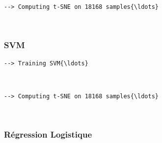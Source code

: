 \documentclass[11pt]{article}
\begin{document}
\begin{center}
\end{center}
{ \hspace*{\fill} \\}

\begin{Verbatim}[commandchars=\\\{\}]
  --> Computing t-SNE on 18168 samples{\ldots}
\end{Verbatim}

\begin{center}
\end{center}
{ \hspace*{\fill} \\}

\subsubsection{SVM}\label{svm}

\begin{Verbatim}[commandchars=\\\{\}]
  --> Training SVM{\ldots}
\end{Verbatim}

\begin{center}
\end{center}
{ \hspace*{\fill} \\}

\begin{Verbatim}[commandchars=\\\{\}]
  --> Computing t-SNE on 18168 samples{\ldots}
\end{Verbatim}

\begin{center}
\end{center}
{ \hspace*{\fill} \\}

\subsubsection{Régression Logistique}\label{ruxe9gression-logistique}
\end{document}
